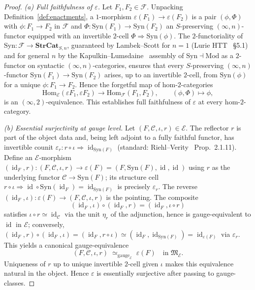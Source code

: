 \documentclass[11pt]{article}
\theoremstyle{plain}
\theoremstyle{definition}
\newcommand{\cF}{\mathcal{F}}
\newcommand{\cC}{\mathcal{C}}
\newcommand{\fM}{\mathfrak{M}}
\newcommand{\Hom}{\mathrm{Hom}}
\newcommand{\Syn}{\mathrm{Syn}}
\newcommand{\Mod}{\mathrm{Mod}}
\newcommand{\cE}{\mathcal{E}}
\DeclareMathOperator{\id}{id}
\begin{document}
\begin{proof}
\emph{(a) Full faithfulness of $\varepsilon$.} Let $F_1, F_2 \in \cF$. Unpacking Definition~\ref{def:enactments}, a $1$-morphism $\varepsilon(F_1) \to \varepsilon(F_2)$ is a pair $(\phi, \Phi)$ with $\phi : F_1 \to F_2$ in $\cF$ and $\Phi : \Syn(F_1) \to \Syn(F_2)$ an $S$-preserving $(\infty, n)$-functor equipped with an invertible $2$-cell $\Phi \Rightarrow \Syn(\phi)$. The $2$-functoriality of $\Syn : \cF \to \mathbf{StrCat}_{S, n}$, guaranteed by Lambek--Scott for $n = 1$ (Lurie HTT~\cite{LurieHTT} \S 5.1) and for general $n$ by the Kapulkin--Lumsdaine~\cite{KapulkinLumsdaine2021} assembly of $\Syn \dashv \Mod$ as a $2$-functor on syntactic $(\infty, n)$-categories, ensures that every $S$-preserving $(\infty, n)$-functor $\Syn(F_1) \to \Syn(F_2)$ arises, up to an invertible $2$-cell, from $\Syn(\phi)$ for a unique $\phi : F_1 \to F_2$. Hence the forgetful map of hom-$2$-categories
\[
  \Hom_{\cE}(\varepsilon F_1, \varepsilon F_2) \longrightarrow \Hom_{\cF}(F_1, F_2), \qquad (\phi, \Phi) \mapsto \phi,
\]
is an $(\infty, 2)$-equivalence. This establishes full faithfulness of $\varepsilon$ at every hom-$2$-category.

\emph{(b) Essential surjectivity at gauge level.} Let $(F, \cC, \iota, r) \in \cE$. The reflector $r$ is part of the object data and, being left adjoint to a fully faithful functor, has invertible counit $\varepsilon_r : r \circ \iota \Rightarrow \id_{\Syn(F)}$ (standard: Riehl--Verity~\cite{RiehlVerity2022} Prop.~2.1.11). Define an $\cE$-morphism $(\id_F, r) : (F, \cC, \iota, r) \to \varepsilon(F) = (F, \Syn(F), \id, \id)$ using $r$ as the underlying functor $\cC \to \Syn(F)$; its structure cell $r \circ \iota \Rightarrow \id \circ \Syn(\id_F) = \id_{\Syn(F)}$ is precisely $\varepsilon_r$. The reverse $(\id_F, \iota) : \varepsilon(F) \to (F, \cC, \iota, r)$ is the pointing. The composite
\[
  (\id_F, \iota) \circ (\id_F, r) = (\id_F, \iota \circ r)
\]
satisfies $\iota \circ r \simeq \id_\cC$ via the unit $\eta_r$ of the adjunction, hence is gauge-equivalent to $\id$ in $\cE$; conversely, $(\id_F, r) \circ (\id_F, \iota) = (\id_F, r \circ \iota) \simeq (\id_F, \id_{\Syn(F)}) = \id_{\varepsilon(F)}$ via $\varepsilon_r$. This yields a canonical gauge-equivalence
\[
  (F, \cC, \iota, r) \;\simeq_{\mathrm{gauge}_\cE}\; \varepsilon(F) \quad\text{in } \fM_\cE.
\]
Uniqueness of $r$ up to unique invertible $2$-cell given $\iota$ makes this equivalence natural in the object. Hence $\varepsilon$ is essentially surjective after passing to gauge-classes.


\end{proof}
\end{document}
